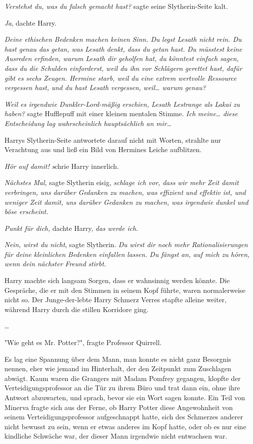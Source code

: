 {\emph{Verstehst du, was du falsch gemacht hast?} sagte seine Slytherin-Seite kalt.

\emph{Ja}, dachte Harry.

\emph{Deine ethischen Bedenken machen keinen Sinn. Du legst Lesath nicht rein. Du hast genau das getan, was Lesath denkt, dass du getan hast. Du müsstest keine Ausreden erfinden, warum Lesath dir geholfen hat, du könntest einfach sagen, dass du die Schulden einforderst, weil du ihn vor Schlägern gerettet hast, dafür gibt es sechs Zeugen. Hermine starb, weil du eine extrem wertvolle Ressource vergessen hast, und du hast Lesath vergessen, weil… warum genau?}

\emph{Weil es irgendwie Dunkler-Lord-mäßig erschien, Lesath Lestrange als Lakai zu haben?} sagte Hufflepuff mit einer kleinen mentalen Stimme. \emph{Ich meine… diese Entscheidung lag wahrscheinlich hauptsächlich an mir…}

Harrys Slytherin-Seite antwortete darauf nicht mit Worten, strahlte nur Verachtung aus und ließ ein Bild von Hermines Leiche aufblitzen.

\emph{Hör auf damit! s}chrie Harry innerlich.

\emph{Nächstes Mal,} sagte Slytherin eisig, \emph{schlage ich vor, dass wir mehr Zeit damit verbringen, uns darüber Gedanken zu machen, was effizient und effektiv ist, und weniger Zeit damit, uns darüber Gedanken zu machen, was irgendwie dunkel und böse erscheint.}

\emph{Punkt für dich,} dachte Harry, \emph{das werde ich.}

\emph{Nein, wirst du nicht}, sagte Slytherin. \emph{Du wirst dir noch mehr Rationalisierungen für deine kleinlichen Bedenken einfallen lassen. Du fängst an, auf mich zu hören, wenn dein nächster Freund stirbt.}

Harry machte sich langsam Sorgen, dass er wahnsinnig werden könnte. Die Gespräche, die er mit den Stimmen in seinem Kopf führte, waren normalerweise nicht so. Der Junge-der-lebte Harry Schmerz Verres stapfte alleine weiter, während Harry durch die stillen Korridore ging.

…

"Wie geht es Mr. Potter?", fragte Professor Quirrell.

Es lag eine Spannung über dem Mann, man konnte es nicht ganz Besorgnis nennen, eher wie jemand im Hinterhalt, der den Zeitpunkt zum Zuschlagen abwägt. Kaum waren die Grangers mit Madam Pomfrey gegangen, klopfte der Verteidigungsprofessor an die Tür zu ihrem Büro und trat dann ein, ohne ihre Antwort abzuwarten, und sprach, bevor sie ein Wort sagen konnte. Ein Teil von Minerva fragte sich aus der Ferne, ob Harry Potter diese Angewohnheit von seinem Verteidigungsprofessor aufgeschnappt hatte, sich des Schmerzes anderer nicht bewusst zu sein, wenn er etwas anderes im Kopf hatte, oder ob es nur eine kindliche Schwäche war, der dieser Mann irgendwie nicht entwachsen war.

}
